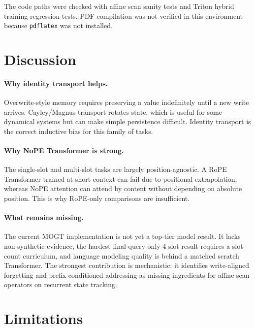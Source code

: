 \documentclass[10pt]{article}
\newcommand{\mogt}{MOGT}
\begin{document}
The code paths were checked with affine scan sanity tests and Triton hybrid
training regression tests. PDF compilation was not verified in this environment
because \texttt{pdflatex} was not installed.

\section{Discussion}

\paragraph{Why identity transport helps.}
Overwrite-style memory requires preserving a value indefinitely until a new
write arrives. Cayley/Magnus transport rotates state, which is useful for some
dynamical systems but can make simple persistence difficult. Identity transport
is the correct inductive bias for this family of tasks.

\paragraph{Why NoPE Transformer is strong.}
The single-slot and multi-slot tasks are largely position-agnostic. A RoPE
Transformer trained at short context can fail due to positional extrapolation,
whereas NoPE attention can attend by content without depending on absolute
position. This is why RoPE-only comparisons are insufficient.

\paragraph{What remains missing.}
The current \mogt{} implementation is not yet a top-tier model result. It lacks
non-synthetic evidence, the hardest final-query-only 4-slot result requires a
slot-count curriculum, and language modeling quality is behind a matched
scratch Transformer. The strongest contribution is mechanistic: it identifies
write-aligned forgetting and prefix-conditioned addressing as missing
ingredients for affine scan operators on recurrent state tracking.

\section{Limitations}
\end{document}
